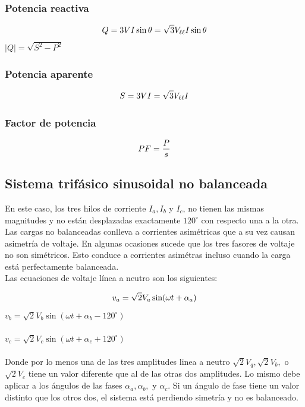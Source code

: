 \subsubsection{Potencia reactiva}


\begin{equation}\label{EQ38}
Q=3VI\sin\theta=\sqrt{3}V_{\ell \ell}I\sin\theta\\
\end{equation}
$|Q|=\sqrt{S^2-P^2}$\\

\subsubsection{Potencia aparente}

\begin{equation}\label{EQ39}
S=3VI=\sqrt{3}V_{\ell \ell}I\\
\end{equation}

\subsubsection{Factor de potencia}

\begin{equation}\label{EQ40}
PF=\frac{P}{s}\\
\end{equation}

\subsection{Sistema trifásico sinusoidal no balanceada}

En este caso, los tres hilos de corriente \textbf{$I_{a},I_{b}$} y \textbf{$I_{c}$}, no tienen las mismas magnitudes y no están desplazadas exactamente $120^{\circ}$ con respecto una a la otra. Las cargas no balanceadas  conlleva a corrientes asimétricas que a su vez causan asimetría de voltaje. En algunas ocasiones sucede que los tres fasores de voltaje no son simétricos. Esto conduce a corrientes asimétras incluso cuando la carga está perfectamente balanceada.\cite{A30}\\


Las ecuaciones de voltaje línea a neutro son los siguientes:

\begin{equation}\label{EQ41}
v_{a}=\sqrt{2}V_{a}\sin(\omega t+\alpha_{a})\\
\end{equation}
$v_{b}=\sqrt{2}V_{b}\sin(\omega t+\alpha_{b} -120^{\circ})$\\\\
$v_{c}=\sqrt{2}V_{c}\sin(\omega t+\alpha_{c}+120^{\circ})$\\\\
Donde por lo menos una de las tres amplitudes linea a neutro $\sqrt{2}V_{q},\sqrt{2}V_{b},$ o $\sqrt{2}V_{c}$ tiene un valor diferente que al de las otras dos amplitudes. Lo mismo debe aplicar a los ángulos de las fases $\alpha_{a}, \alpha_{b},$ y $\alpha_{c}$. Si un ángulo de fase tiene un valor distinto que los otros dos, el sistema está perdiendo simetría y no es balanceado.\cite{A30}\\



